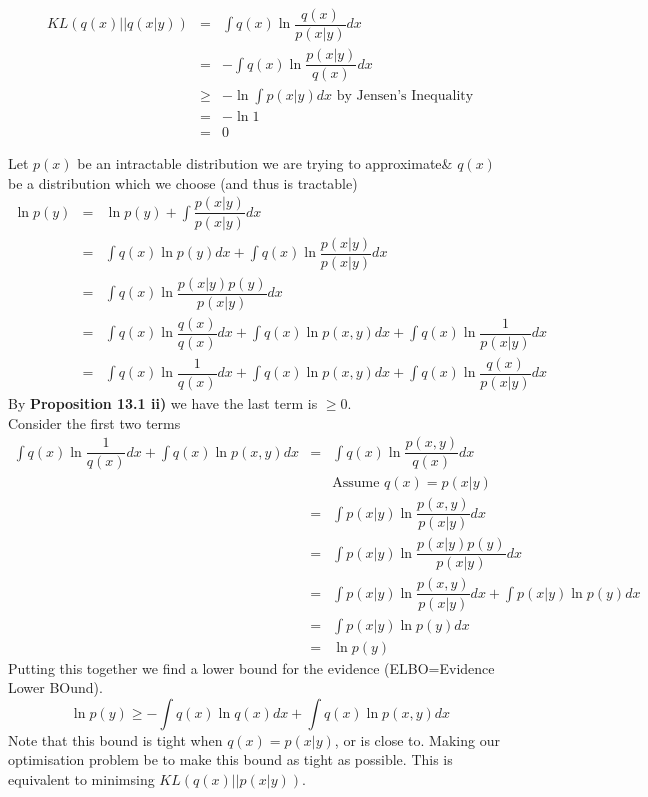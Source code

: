 \documentclass[11pt,a4paper]{article}
\begin{document}
\[\begin{array}{rcl}
KL(q(x)||q(x|y))&=&\displaystyle\int q(x)\ln\dfrac{q(x)}{p(x|y)}dx\\
&=&-\displaystyle\int q(x)\ln\dfrac{p(x|y)}{q(x)}dx\\
&\geq&-\ln\displaystyle\int p(x|y)dx\text{ by Jensen's Inequality}\\
&=&-\ln 1\\
&=&0
\end{array}\]

Let $p(x)$ be an intractable distribution we are trying to approximate\& $q(x)$ be a distribution which we choose (and thus is tractable)
\[\begin{array}{rcl}
\ln p(y)&=&\ln p(y)+\displaystyle\int\dfrac{p(x|y)}{p(x|y)}dx\\
&=&\displaystyle\int q(x)\ln p(y)dx+\displaystyle\int q(x)\ln\dfrac{p(x|y)}{p(x|y)}dx\\
&=&\displaystyle\int q(x)\ln\dfrac{p(x|y)p(y)}{p(x|y)}dx\\
&=&\displaystyle\int q(x)\ln\dfrac{q(x)}{q(x)}dx+\displaystyle\int q(x)\ln p(x,y)dx+\displaystyle\int q(x)\ln\dfrac{1}{p(x|y)}dx\\
&=&\displaystyle\int q(x)\ln\dfrac{1}{q(x)}dx+\displaystyle\int q(x)\ln p(x,y)dx+\displaystyle\int q(x)\ln\dfrac{q(x)}{p(x|y)}dx
\end{array}\]
By \textbf{Proposition 13.1 ii)} we have the last term is $\geq 0$.\\
Consider the first two terms
\[\begin{array}{rcl}
\displaystyle\int q(x)\ln\dfrac{1}{q(x)}dx+\displaystyle\int q(x)\ln p(x,y)dx&=&\displaystyle\int q(x)\ln\dfrac{p(x,y)}{q(x)}dx\\
&&\text{Assume }q(x)=p(x|y)\\
&=&\displaystyle\int p(x|y)\ln\dfrac{p(x,y)}{p(x|y)}dx\\
&=&\displaystyle\int p(x|y)\ln\dfrac{p(x|y)p(y)}{p(x|y)}dx\\
&=&\displaystyle\int p(x|y)\ln\dfrac{p(x,y)}{p(x|y)}dx+\displaystyle\int p(x|y)\ln p(y)dx\\
&=&\displaystyle\int p(x|y)\ln p(y)dx\\
&=&\ln p(y)
\end{array}\]
Putting this together we find a lower bound for the evidence (ELBO=Evidence Lower BOund).
$$\ln p(y)\geq-\int q(x)\ln q(x)dx+\int q(x)\ln p(x,y)dx$$
Note that this bound is tight when $q(x)=p(x|y)$, or is close to. Making our optimisation problem be to make this bound as tight as possible. This is equivalent to minimsing $KL(q(x)||p(x|y))$.\\
\end{document}
